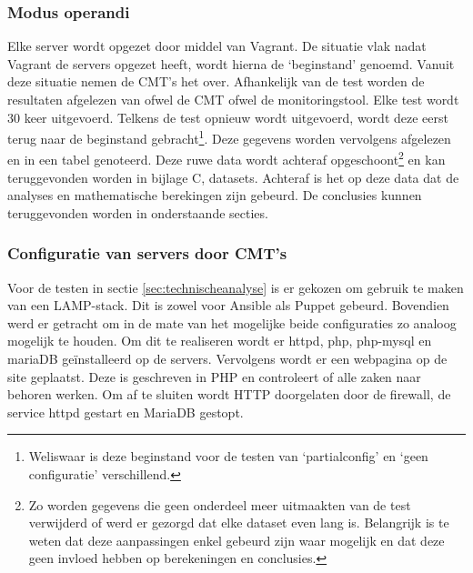 
\subsubsection{Modus operandi}

Elke server wordt opgezet door middel van Vagrant. De situatie vlak nadat Vagrant de servers opgezet heeft, wordt hierna de ‘beginstand' genoemd.
Vanuit deze situatie nemen de \gls{CMT}'s het over. Afhankelijk van de test worden de resultaten afgelezen van ofwel de \gls{CMT} ofwel de monitoringstool. 
Elke test wordt 30 keer uitgevoerd. Telkens de test opnieuw wordt uitgevoerd, wordt deze eerst terug naar de beginstand gebracht\footnote{Weliswaar is deze beginstand voor de testen van ‘\gls{partialconfig}' en ‘geen configuratie' verschillend.}.
Deze gegevens worden vervolgens afgelezen en in een tabel genoteerd. Deze ruwe data wordt achteraf opgeschoont\footnote{Zo worden gegevens die geen onderdeel meer uitmaakten van de test verwijderd of werd er gezorgd dat elke dataset even lang is. Belangrijk is te weten dat deze aanpassingen enkel gebeurd zijn waar mogelijk en dat deze geen invloed hebben op berekeningen en conclusies. } en kan teruggevonden worden in bijlage C, datasets. Achteraf is het op deze data dat de analyses en mathematische berekingen zijn gebeurd. De conclusies kunnen teruggevonden worden in onderstaande secties.

\subsubsection{Configuratie van servers door CMT's }


Voor de testen in sectie \ref{sec:technischeanalyse} is er gekozen om gebruik te maken van een LAMP-stack. Dit is zowel voor Ansible als Puppet gebeurd. Bovendien werd er getracht om in de mate van het mogelijke beide configuraties zo analoog mogelijk te houden. Om dit te realiseren wordt er httpd, php, php-mysql en mariaDB ge\"installeerd op de servers. Vervolgens wordt er een webpagina op de site geplaatst. Deze is geschreven in PHP en controleert of alle zaken naar behoren werken. Om af te sluiten wordt HTTP doorgelaten door de firewall, de service httpd gestart en MariaDB gestopt. 

